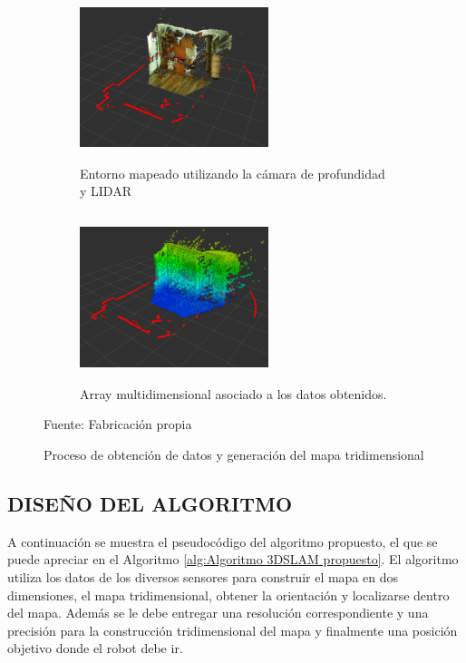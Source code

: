\begin{figure}[H]
    \centering
    \begin{subfigure}[b]{0.40\textwidth}
    \includegraphics[width=5.5cm, height=4.9cm]{figures/03propuesta_solucion/slam_normal.png}
    \caption{Entorno mapeado utilizando la cámara de profundidad y LIDAR}
    \label{fig:gmapping_sim}
    \end{subfigure}
    \hspace{5mm}
    \begin{subfigure}[b]{0.40\textwidth}
        \includegraphics[width=5.5cm, height=4.9cm]{figures/03propuesta_solucion/slam_octree.png}
    \caption{Array multidimensional asociado a los datos obtenidos.}
    \label{fig:gmapping_map}
    \end{subfigure}
    \caption{Proceso de obtención de datos y generación del mapa tridimensional}
    Fuente: Fabricación propia
    \label{fig:mapeo_tridimensional}
\end{figure}


\newpage
\subsection{DISEÑO DEL ALGORITMO}

A continuación se muestra el pseudocódigo del algoritmo propuesto, el que se puede apreciar en el Algoritmo \ref{alg:Algoritmo 3DSLAM propuesto}. El algoritmo utiliza los datos de los diversos sensores para construir el mapa en dos dimensiones, el mapa tridimensional, obtener la orientación y localizarse dentro del mapa. Además se le debe entregar una resolución correspondiente y una precisión para la construcción tridimensional del mapa y finalmente una posición objetivo donde el robot debe ir.

